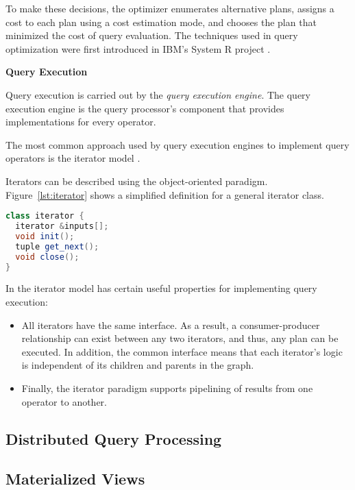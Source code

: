 To make these decisions, the optimizer enumerates alternative plans,
assigns a cost to each plan using a cost estimation mode,
and chooses the plan that minimized the cost of query evaluation.
The techniques used in query optimization were first introduced in IBM's System R project \cite{selinger:systemr}.

\bigskip
\noindent
\textbf{Query Execution}

Query execution is carried out by the \textit{query execution engine}.
The query execution engine is the query processor's component that provides implementations for every operator.

The most common approach used by query execution engines to implement query operators is the iterator model
\cite{graefe:queryevaluation}.

Iterators can be described using the object-oriented paradigm.
Figure~\ref{lst:iterator} shows a simplified definition for a general iterator class.

\begin{lstlisting}[caption={Iterator class pseudocode \cite{hellerstein:databasearchitecture}},label={lst:iterator},captionpos=b,language=Java]
class iterator {
  iterator &inputs[];
  void init();
  tuple get_next();
  void close();
}
\end{lstlisting}

In the iterator model has certain useful properties for implementing query execution:
\begin{itemize}

  \item All iterators have the same interface.
  As a result, a consumer-producer relationship can exist between any two iterators, and thus, any plan can be executed.
  In addition, the common interface means that each iterator's logic is independent of its children and parents in the graph.

  \item Finally, the iterator paradigm supports pipelining of results from one operator to another.

\end{itemize}

\subsection{Distributed Query Processing}

\subsection{Materialized Views}


